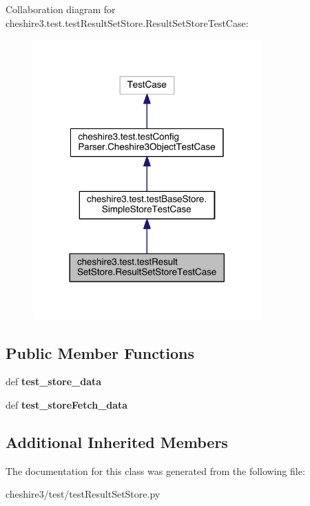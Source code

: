 Collaboration diagram for cheshire3.\-test.\-test\-Result\-Set\-Store.\-Result\-Set\-Store\-Test\-Case\-:
\nopagebreak
\begin{figure}[H]
\begin{center}
\leavevmode
\includegraphics[width=248pt]{classcheshire3_1_1test_1_1test_result_set_store_1_1_result_set_store_test_case__coll__graph}
\end{center}
\end{figure}
\subsection*{Public Member Functions}
\begin{DoxyCompactItemize}
\item 
\hypertarget{classcheshire3_1_1test_1_1test_result_set_store_1_1_result_set_store_test_case_a9c515a53e2809fed61dcbc6e159a8eee}{def {\bfseries test\-\_\-store\-\_\-data}}\label{classcheshire3_1_1test_1_1test_result_set_store_1_1_result_set_store_test_case_a9c515a53e2809fed61dcbc6e159a8eee}

\item 
\hypertarget{classcheshire3_1_1test_1_1test_result_set_store_1_1_result_set_store_test_case_ae8e514361c8863b985353d71bbcc3d03}{def {\bfseries test\-\_\-store\-Fetch\-\_\-data}}\label{classcheshire3_1_1test_1_1test_result_set_store_1_1_result_set_store_test_case_ae8e514361c8863b985353d71bbcc3d03}

\end{DoxyCompactItemize}
\subsection*{Additional Inherited Members}


The documentation for this class was generated from the following file\-:\begin{DoxyCompactItemize}
\item 
cheshire3/test/test\-Result\-Set\-Store.\-py\end{DoxyCompactItemize}
